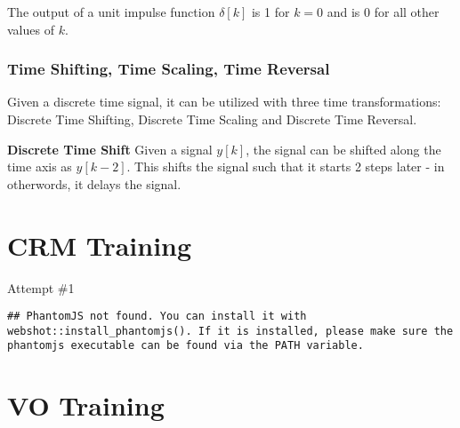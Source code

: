 \documentclass[
]{book}
\theoremstyle{definition}
\theoremstyle{definition}
\theoremstyle{definition}
\theoremstyle{remark}
\begin{document}
The output of a unit impulse function \(\delta[k]\) is 1 for \(k=0\) and is 0 for all other values of \(k\).

\hypertarget{time-shifting-time-scaling-time-reversal}{%
\subsection{Time Shifting, Time Scaling, Time Reversal}\label{time-shifting-time-scaling-time-reversal}}

Given a discrete time signal, it can be utilized with three time transformations: Discrete Time Shifting, Discrete Time Scaling and Discrete Time Reversal.

\textbf{Discrete Time Shift}
Given a signal \(y[k]\), the signal can be shifted along the time axis as \(y[k-2]\). This shifts the signal such that it starts 2 steps later - in otherwords, it delays the signal.

\hypertarget{crm-training}{%
\chapter{CRM Training}\label{crm-training}}

Attempt \#1

\begin{verbatim}
## PhantomJS not found. You can install it with webshot::install_phantomjs(). If it is installed, please make sure the phantomjs executable can be found via the PATH variable.
\end{verbatim}

\hypertarget{vo-training}{%
\chapter{VO Training}\label{vo-training}}

  
\end{document}
